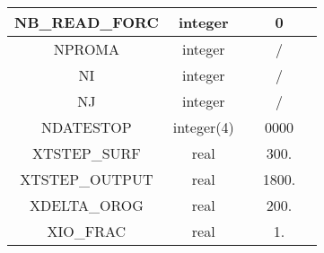 {\begin{tabular}{|c|c|c|c|c|}
\hline
NB\_READ\_FORC           & integer          &                                   &   0         &                 \\
\hline
NPROMA                   & integer          &                                   &   /         &                 \\
\hline
NI                       & integer          &                                   &   /         &                 \\
\hline
NJ                       & integer          &                                   &   /         &                 \\
\hline
NDATESTOP                & integer(4)       &                                   &   0000      &                 \\
\hline
XTSTEP\_SURF             & real             &                                   &   300.      &                 \\
\hline
XTSTEP\_OUTPUT           & real             &                                   &   1800.     &                 \\
\hline
XDELTA\_OROG             & real             &                                   &   200.      &                 \\
\hline
XIO\_FRAC                & real             &                                   &   1.        &                 \\
\hline
\end{tabular}
}

